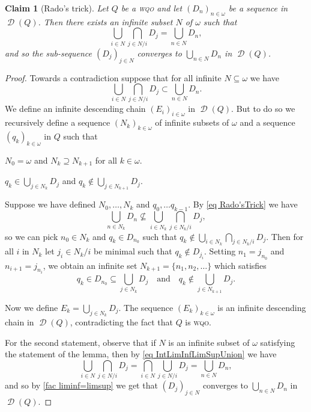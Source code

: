 \documentclass{article}%
\theoremstyle{plain}
\newtheorem{lemma}[theorem]{Properties}
\newtheorem{lemma}[theorem]{Lemma}
\newtheorem{lemma}[theorem]{Fact}
\newtheorem{lemma}[theorem]{Facts}
\newtheorem{lemma}{Claim}
\theoremstyle{definition}
\theoremstyle{remark}
\newcommand{\wqo}{\textsc{wqo}}
\DeclareMathOperator{\Down}{\mathcal{D}} %
\begin{document}
\begin{lemma}[Rado's trick]\label{radoLem}
Let $Q$ be a \wqo{} and let $(D_{n})_{n\in\omega}$ be a sequence in $\Down(Q)$. Then there exists an infinite subset $N$ of $\omega$ such that
\[
\bigcup_{i\in N}\bigcap_{j\in N/i}D_{j}=\bigcup_{n\in N} D_{n},
\]
and so the sub-sequence $(D_{j})_{j\in N}$ converges to $\bigcup_{n\in N}D_{n}$ in $\Down(Q)$.
\end{lemma}\begin{proof}
Towards a contradiction suppose that for all infinite $N\subseteq \omega$ we have
\begin{equation}\label{eq Rado'sTrick}
\bigcup_{i\in N}\bigcap_{ j\in N/i}D_{j}\subset \bigcup_{n\in N} D_{n}.
\end{equation}
We define an infinite descending chain $(E_i)_{i\in\omega}$ in $\Down(Q)$. But to do so we recursively define a sequence $(N_k)_{k\in\omega}$ of infinite subsets of $\omega$ and a sequence $(q_{k})_{k\in \omega}$ in $Q$ such that
\begin{enumProof}
\item $N_{0}=\omega$ and $N_{k}\supseteq N_{k+1}$ for all $k\in \omega$.
\item $q_{k}\in \bigcup_{j\in N_{k}}D_{j}$ and $q_{k}\notin \bigcup_{j\in N_{k+1}} D_{j}$.
\end{enumProof}
Suppose we have defined $N_{0},\ldots,N_{k}$ and $q_{0},\ldots q_{k-1}$. By \cref{eq Rado'sTrick} we have 
\[
\bigcup_{n\in N_{k}}D_{n}\nsubseteq \bigcup_{i\in N_{k}}\bigcap_{j\in N_{k}/i} D_{j},\]
so we can pick $n_{0}\in N_{k}$ and $q_{k}\in D_{n_{0}}$ such that $q_{k}\notin \bigcup_{i\in N_{k}}\bigcap_{j\in N_{k}/i}D_{j}$. Then for all $i$ in $N_{k}$ let $j_{i}\in N_{k}/i$ be minimal such that $q_{k}\notin D_{j_{i}}$. Setting $n_{1}=j_{n_{0}}$ and $n_{i+1}=j_{n_{i}}$, we obtain an infinite set $N_{k+1}=\{n_{1},n_{2},\ldots\}$ which satisfies 
\[q_{k}\in D_{n_{0}}\subseteq \bigcup_{j\in N_{k}}D_{j} \quad \text{and}\quad q_{k}\notin \bigcup_{j\in N_{k+1}} D_{j}.\]

Now we define $E_{k}=\bigcup_{j\in N_{k}}D_{j}$. The sequence $(E_k)_{k\in\omega}$ is an infinite descending chain in $\Down(Q)$, contradicting the fact that $Q$ is \wqo{}.

For the second statement, observe that if $N$ is an infinite subset of $\omega$ satisfying the statement of the lemma, then by \cref{eq IntLimInfLimSupUnion} we have
\[
\bigcup_{i\in N}\bigcap_{j\in N/i}D_{j}= \bigcap_{i\in N}\bigcup_{j\in N/i}D_{j}= \bigcup_{n\in N} D_{n},
\]
and so by \cref{fac liminf=limsup} we get that $(D_{j})_{j\in N}$ converges to $\bigcup_{n\in N} D_{n}$ in $\Down(Q)$.
\end{proof}
\end{document}
